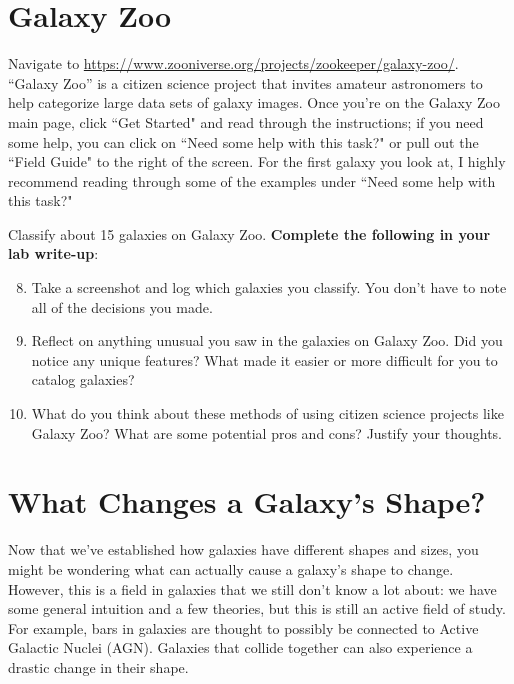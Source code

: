 \documentclass[11pt]{article}
\begin{document}
\medskip


\section{Galaxy Zoo}

Navigate to \url{https://www.zooniverse.org/projects/zookeeper/galaxy-zoo/}. ``Galaxy Zoo'' is a citizen science project that invites amateur astronomers to help categorize large data sets of galaxy images. Once you're on the Galaxy Zoo main page, click ``Get Started" and read through the instructions; if you need some help, you can click on ``Need some help with this task?" or pull out the ``Field Guide" to the right of the screen. For the first galaxy you look at, I highly recommend reading through some of the examples under ``Need some help with this task?" 

\medskip \noindent
Classify about 15 galaxies on Galaxy Zoo. \textbf{Complete the following in your lab write-up}:
\begin{enumerate}
\setcounter{enumi}{7}

    \item Take a screenshot and log which galaxies you classify. You don't have to note all of the decisions you made.
    
    \item Reflect on anything unusual you saw in the galaxies on Galaxy Zoo. Did you notice any unique features? What made it easier or more difficult for you to catalog galaxies?

    \item What do you think about these methods of using citizen science projects like Galaxy Zoo? What are some potential pros and cons? Justify your thoughts.
\end{enumerate}

\section{What Changes a Galaxy's Shape?}

Now that we've established how galaxies have different shapes and sizes, you might be wondering what can actually cause a galaxy's shape to change. However, this is a field in galaxies that we still don't know a lot about: we have some general intuition and a few theories, but this is still an active field of study. For example, bars in galaxies are thought to possibly be connected to Active Galactic Nuclei (AGN). Galaxies that collide together can also experience a drastic change in their shape.
\end{document}
